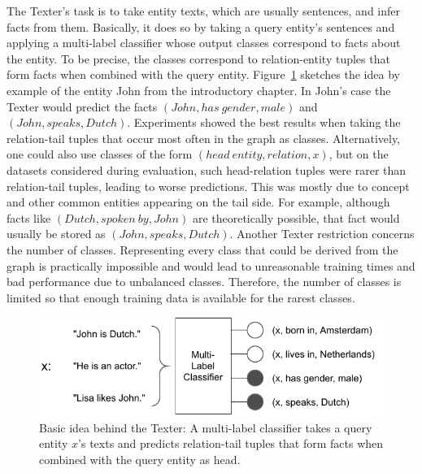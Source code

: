 The Texter's task is to take entity texts, which are usually sentences, and infer facts from them. Basically, it does so by taking a query entity's sentences and applying a multi-label classifier whose output classes correspond to facts about the entity. To be precise, the classes correspond to relation-entity tuples that form facts when combined with the query entity. Figure~\ref{fig:4_approach/1_texter/texter_idea} sketches the idea by example of the entity John from the introductory chapter. In John's case the Texter would predict the facts $(John, has~gender, male)$ and $(John, speaks, Dutch)$. Experiments showed the best results when taking the relation-tail tuples that occur most often in the graph as classes. Alternatively, one could also use classes of the form $(head~entity, relation, x)$, but on the datasets considered during evaluation, such head-relation tuples were rarer than relation-tail tuples, leading to worse predictions. This was mostly due to concept and other common entities appearing on the tail side. For example, although facts like $(Dutch, spoken~by, John)$ are theoretically possible, that fact would usually be stored as $(John, speaks, Dutch)$. Another Texter restriction concerns the number of classes. Representing every class that could be derived from the graph is practically impossible and would lead to unreasonable training times and bad performance due to unbalanced classes. Therefore, the number of classes is limited so that enough training data is available for the rarest classes.

\begin{figure}[t]
    \centering
    \includegraphics[width=\textwidth]{4_approach/1_texter/texter_idea}
    \caption{Basic idea behind the Texter: A multi-label classifier takes a query entity $x$'s texts and predicts relation-tail tuples that form facts when combined with the query entity as head.}
    \label{fig:4_approach/1_texter/texter_idea}
\end{figure}

